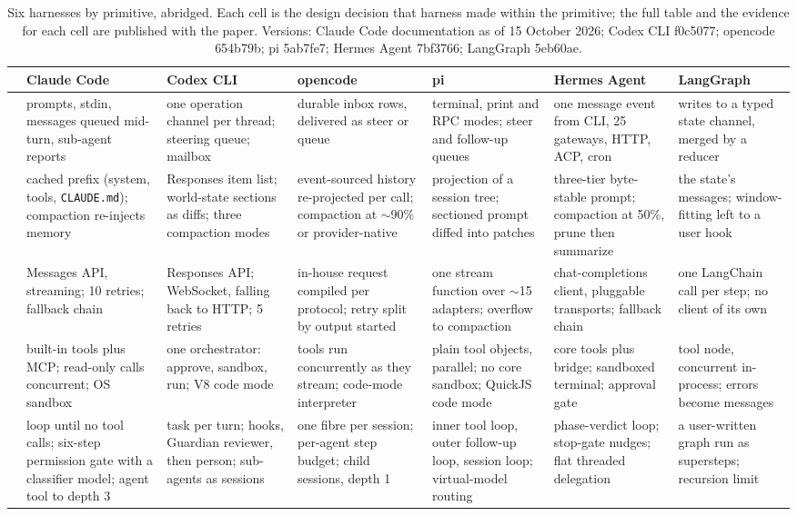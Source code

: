 \begin{table}[t]
\centering
\scriptsize
\setlength{\tabcolsep}{4pt}
\renewcommand{\arraystretch}{1.05}
\caption{Six harnesses by primitive, abridged. Each cell is the design decision that harness made within the primitive; the full table and the evidence for each cell are published with the paper. Versions: Claude Code documentation as of 15 October 2026; Codex CLI f0c5077; opencode 654b79b; pi 5ab7fe7; Hermes Agent 7bf3766; LangGraph 5eb60ae.}
\label{tab:summary}
\begin{tabularx}{\textwidth}{@{}>{\bfseries}p{1.5cm}YYYYYY@{}}
\toprule
& Claude Code & Codex CLI & opencode & pi & Hermes Agent & LangGraph \\
\midrule
{} & prompts, stdin, messages queued mid-turn, sub-agent reports & one operation channel per thread; steering queue; mailbox & durable inbox rows, delivered as steer or queue & terminal, print and RPC modes; steer and follow-up queues & one message event from CLI, 25 gateways, HTTP, ACP, cron & writes to a typed state channel, merged by a reducer \\
\addlinespace
{} & cached prefix (system, tools, \texttt{CLAUDE.md}); compaction re-injects memory & Responses item list; world-state sections as diffs; three compaction modes & event-sourced history re-projected per call; compaction at $\sim$90\% or provider-native & projection of a session tree; sectioned prompt diffed into patches & three-tier byte-stable prompt; compaction at 50\%, prune then summarize & the state's messages; window-fitting left to a user hook \\
\addlinespace
{}\newline{} & Messages API, streaming; 10 retries; fallback chain & Responses API; WebSocket, falling back to HTTP; 5 retries & in-house request compiled per protocol; retry split by output started & one stream function over $\sim$15 adapters; overflow to compaction & chat-completions client, pluggable transports; fallback chain & one LangChain call per step; no client of its own \\
\addlinespace
{} & built-in tools plus MCP; read-only calls concurrent; OS sandbox & one orchestrator: approve, sandbox, run; V8 code mode & tools run concurrently as they stream; code-mode interpreter & plain tool objects, parallel; no core sandbox; QuickJS code mode & core tools plus bridge; sandboxed terminal; approval gate & tool node, concurrent in-process; errors become messages \\
\addlinespace
{} & loop until no tool calls; six-step permission gate with a classifier model; agent tool to depth 3 & task per turn; hooks, Guardian reviewer, then person; sub-agents as sessions & one fibre per session; per-agent step budget; child sessions, depth 1 & inner tool loop, outer follow-up loop, session loop; virtual-model routing & phase-verdict loop; stop-gate nudges; flat threaded delegation & a user-written graph run as supersteps; recursion limit \\
\bottomrule
\end{tabularx}
\end{table}

